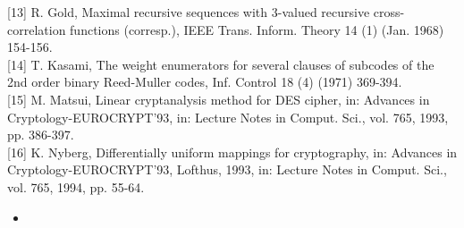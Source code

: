 \documentclass[10pt]{article}
\begin{document}
[13] R. Gold, Maximal recursive sequences with 3-valued recursive cross-correlation functions (corresp.), IEEE Trans. Inform. Theory 14 (1) (Jan. 1968) 154-156.\\[0pt]
[14] T. Kasami, The weight enumerators for several clauses of subcodes of the 2nd order binary Reed-Muller codes, Inf. Control 18 (4) (1971) 369-394.\\[0pt]
[15] M. Matsui, Linear cryptanalysis method for DES cipher, in: Advances in Cryptology-EUROCRYPT'93, in: Lecture Notes in Comput. Sci., vol. 765, 1993, pp. 386-397.\\[0pt]
[16] K. Nyberg, Differentially uniform mappings for cryptography, in: Advances in Cryptology-EUROCRYPT'93, Lofthus, 1993, in: Lecture Notes in Comput. Sci., vol. 765, 1994, pp. 55-64.

\begin{itemize}
  \item 
\end{itemize}
\end{document}
